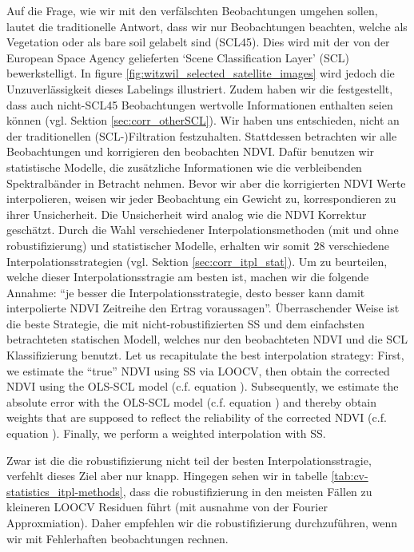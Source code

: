     Auf die Frage, wie wir mit den verfälschten Beobachtungen umgehen sollen, lautet die traditionelle Antwort, dass wir nur Beobachtungen beachten, welche als Vegetation oder als bare soil gelabelt sind (SCL45). Dies wird mit der von der European Space Agency gelieferten `Scene Classification Layer' (SCL) bewerkstelligt. In figure \ref{fig:witzwil_selected_satellite_images} wird jedoch die Unzuverlässigkeit dieses Labelings illustriert. Zudem haben wir die festgestellt, dass auch nicht-SCL45 Beobachtungen wertvolle Informationen enthalten seien können (vgl. Sektion \ref{sec:corr_otherSCL}). Wir haben uns entschieden, nicht an der traditionellen (SCL-)Filtration festzuhalten. Stattdessen betrachten wir alle Beobachtungen und korrigieren den beobachten NDVI. Dafür benutzen wir statistische Modelle, die zusätzliche Informationen wie die verbleibenden Spektralbänder in Betracht nehmen. Bevor wir aber die korrigierten NDVI Werte interpolieren, weisen wir jeder Beobachtung ein Gewicht zu, korrespondieren zu ihrer Unsicherheit. Die Unsicherheit wird analog wie die NDVI Korrektur geschätzt. 
    Durch die Wahl verschiedener Interpolationsmethoden (mit und ohne robustifizierung) und statistischer Modelle, erhalten wir somit 28 verschiedene Interpolationsstrategien (vgl. Sektion \ref{sec:corr_itpl_stat}). Um zu beurteilen, welche dieser Interpolationsstragie am besten ist, machen wir die folgende Annahme: ``je besser die Interpolationsstrategie, desto besser kann damit interpolierte NDVI Zeitreihe den Ertrag voraussagen''. Überraschender Weise ist die beste Strategie, die mit nicht-robustifizierten SS und dem einfachsten betrachteten statischen Modell, welches nur den beobachteten NDVI und die SCL Klassifizierung benutzt.
    Let us recapitulate the best interpolation strategy: First, we estimate the ``true'' NDVI using SS via LOOCV, then obtain the corrected NDVI using the OLS-SCL model (c.f. equation ). Subsequently, we estimate the absolute error with the OLS-SCL model (c.f. equation ) and thereby obtain weights that are supposed to reflect the reliability of the corrected NDVI (c.f. equation ). Finally, we perform a weighted interpolation with SS.

Zwar ist die die robustifizierung nicht teil der besten Interpolationsstragie, verfehlt dieses Ziel aber nur knapp. Hingegen sehen wir in tabelle \ref{tab:cv-statistics_itpl-methods}, dass die robustifizierung in den meisten Fällen zu kleineren LOOCV Residuen führt (mit ausnahme von der Fourier Approxmiation). Daher empfehlen wir die robustifizierung durchzuführen, wenn wir mit Fehlerhaften beobachtungen rechnen. 

